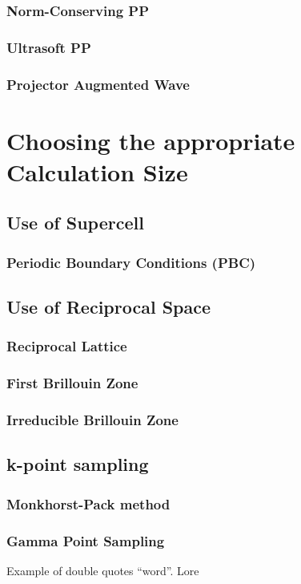         \subsubsection{Norm-Conserving PP}
        \subsubsection{Ultrasoft PP}
        \subsubsection{Projector Augmented Wave}
\section{Choosing the appropriate Calculation Size}
    \subsection{Use of Supercell}
        \subsubsection{Periodic Boundary Conditions (PBC)}
    \subsection{Use of Reciprocal Space}
        \subsubsection{Reciprocal Lattice}
        \subsubsection{First Brillouin Zone}
        \subsubsection{Irreducible Brillouin Zone}
    \subsection{k-point sampling}
        \subsubsection{Monkhorst-Pack method}
        \subsubsection{Gamma Point Sampling}
        Example of double quotes ``word''. Lore

